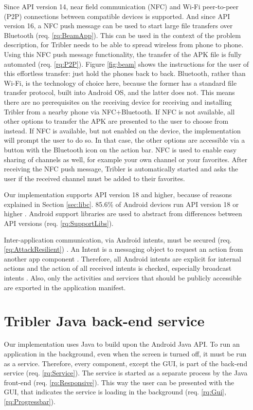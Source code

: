 Since API version 14, near field communication (NFC) and Wi-Fi peer-to-peer (P2P) connections between compatible devices is supported.
And since API version 16, a NFC push message can be used to start large file transfers over Bluetooth (req. \ref{rq:BeamApp}).
This can be used in the context of the problem description, for Tribler needs to be able to spread wireless from phone to phone.
Using this NFC push message functionality, the transfer of the APK file is fully automated (req. \ref{rq:P2P}).
Figure \ref{fig:beam} shows the instructions for the user of this effortless transfer: just hold the phones back to back.
Bluetooth, rather than Wi-Fi, is the technology of choice here, because the former has a standard file transfer protocol, built into Android OS, and the latter does not.
This means there are no prerequisites on the receiving device for receiving and installing Tribler from a nearby phone via NFC+Bluetooth.
If NFC is not available, all other options to transfer the APK are presented to the user to choose from instead.
If NFC is available, but not enabled on the device, the implementation will prompt the user to do so.
In that case, the other options are accessible via a button with the Bluetooth icon on the action bar.
NFC is used to enable easy sharing of channels as well, for example your own channel or your favorites.
After receiving the NFC push message, Tribler is automatically started and asks the user if the received channel must be added to their favorites.

Our implementation supports API version 18 and higher, because of reasons explained in Section \ref{sec:libc}.
85.6\% of Android devices run API version 18 or higher \cite{android-dashboard}.
Android support libraries are used to abstract from differences between API versions (req. \ref{rq:SupportLibs}).

Inter-application communication, via Android intents, must be secured (req. \ref{rq:AttackResilient}) .
An Intent is a messaging object to request an action from another app component \cite{android-intents}.
Therefore, all Android intents are explicit for internal actions and the action of all received intents is checked, especially broadcast intents \cite{intent-secure}. 
Also, only the activities and services that should be publicly accessible are exported in the application manifest.


\section{Tribler Java back-end service}
Our implementation uses Java to build upon the Android Java API.
To run an application in the background, even when the screen is turned off, it must be run as a service.
Therefore, every component, except the GUI, is part of the back-end service (req. \ref{rq:Service}).
The service is started as a separate process by the Java front-end (req. \ref{rq:Responsive}).
This way the user can be presented with the GUI, that indicates the service is loading in the background (req. \ref{rq:Gui}, \ref{rq:Progressbar}).

